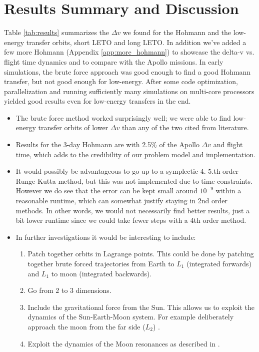 \section{Results Summary and Discussion}
Table \ref{tab:results} summarizes the $\Delta v$ we found for the Hohmann and the low-energy transfer orbits, short LETO and long LETO. In addition we've added a few more Hohmann (Appendix \ref{app:more_hohmann}) to showcase the delta-v vs. flight time dynamics and to compare with the Apollo missions. In early simulations, the brute force approach was good enough to find a good Hohmann transfer, but not good enough for low-energy. After some code optimization, parallelization and running sufficiently many simulations on multi-core processors yielded good results even for low-energy transfers in the end.
\begin{itemize}
    \item The brute force method worked surprisingly well; we were able to find low-energy transfer orbits of lower $\Delta v$ than any of the two cited from literature.
    \item Results for the 3-day Hohmann are with 2.5\% of the Apollo $\Delta v$ and flight time, which adds to the credibility of our problem model and implementation.
    \item It would possibly be advantageous to go up to a symplectic 4.-5.th order Runge-Kutta method, but this was not implemented due to time-constraints. However we do see that the error can be kept small around $10^{-9}$ within a reasonable runtime, which can somewhat justify staying in 2nd order methods. In other words, we would not necessarily find better results, just a bit lower runtime since we could take fewer steps with a 4th order method.
    \item In further investigations it would be interesting to include:
    \begin{enumerate}
        \item Patch together orbits in Lagrange points. This could be done by patching together brute forced trajectories from Earth to $L_1$ (integrated forwards) and $L_1$ to moon (integrated backwards).
        \item Go from 2 to 3 dimensions.
        \item Include the gravitational force from the Sun. This allows us to exploit the dynamics of the Sun-Earth-Moon system. For example deliberately approach the moon from the far side ($L_2$) \cite{Koon2001}.
        \item Exploit the dynamics of the Moon resonances as described in \cite{Topputo2005}.
    \end{enumerate}
\end{itemize}
